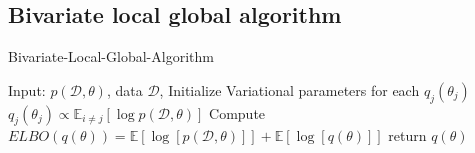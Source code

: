 \subsection{Bivariate local global algorithm}

\begin{algorithm}
	\caption{Bivariate-Local-Global-Algorithm}
	\begin{algorithmic}[1]
		
		\State Input: $p(\mathcal{D},\theta)$, data $\mathcal{D}$, Initialize Variational parameters for each $q_j(\theta_j)$
		\State $q_j(\theta_j) \propto \mathbb{E}_{i\neq j}[\log p(\mathcal{D},\theta)]$
		\EndFor
		\State Compute $ELBO(q(\theta)) = \mathbb{E}[\log[p(\mathcal{D},\theta)]] + \mathbb{E}[\log[q(\theta)]]$
		\EndWhile 
		\State return $q(\theta)$
		
		
		
	\end{algorithmic}
\end{algorithm}
